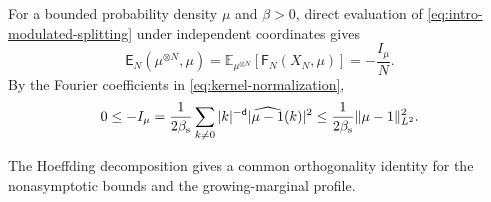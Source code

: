 \documentclass[11pt,reqno]{amsart}
\numberwithin{equation}{section}
\theoremstyle{plain}
\theoremstyle{definition}
\DeclarePairedDelimiter{\norm}{\lVert}{\rVert}
\renewcommand{\d}{\mathsf d}
\newcommand{\E}{\mathbb E}
\newcommand{\be}{\beta}
\newcommand{\Fr}{\mathsf F}
\newcommand{\Er}{\mathsf E}
\newcommand{\wh}{\widehat}
\newcommand{\spec}{\mathrm{s}}
\begin{document}
For a bounded probability density $\mu$ and $\be>0$, direct evaluation of \eqref{eq:intro-modulated-splitting} under independent coordinates gives
\begin{equation}
 \Er_N(\mu^{\otimes N},\mu)=\E_{\mu^{\otimes N}}[\Fr_N(X_N,\mu)]= -\frac{I_\mu}{N}.
 \label{eq:dyn-product-exact}
\end{equation}
By the Fourier coefficients in \eqref{eq:kernel-normalization},
\begin{equation}
 0\leq-I_\mu=\frac1{2\beta_{\spec}}\sum_{k\ne0}|k|^{-\d}|\wh{\mu-1}(k)|^2
 \leq\frac1{2\beta_{\spec}}\norm{\mu-1}_{L^2}^2.
 \label{eq:dyn-product-I}
\end{equation}

The Hoeffding decomposition \cite{Hoeffding1948} gives a common orthogonality identity for the nonasymptotic bounds and the growing-marginal profile.
\end{document}
